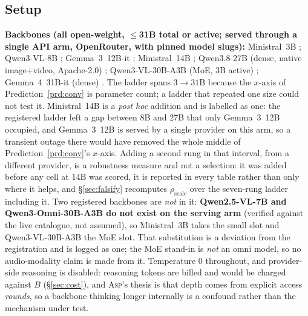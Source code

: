 \documentclass[10pt]{article}
\theoremstyle{definition}
\theoremstyle{plain}
\newcommand{\ASP}{\textsc{Asp}}
\begin{document}
\subsection{Setup}
\label{sec:setup}
\textbf{Backbones (all open-weight, $\le$31B total or active; served through a single API arm, OpenRouter, with pinned model slugs):} Ministral~3B \citep{ministral}; Qwen3-VL-8B \citep{qwen3vl}; Gemma~3~12B-it \citep{gemma3}; Ministral~14B \citep{ministral}; Qwen3.8-27B (dense, native image+video, Apache-2.0) \citep{qwen38}; Qwen3-VL-30B-A3B (MoE, 3B active) \citep{qwen3vl}; Gemma~4~31B-it (dense) \citep{gemma4}. The ladder spans $3\to31$B because the $x$-axis of Prediction~\ref{prd:conv} is parameter count; a ladder that repeated one size could not test it. Ministral~14B is a \emph{post hoc} addition and is labelled as one: the registered ladder left a gap between $8$B and $27$B that only Gemma~3~12B occupied, and Gemma~3~12B is served by a single provider on this arm, so a transient outage there would have removed the whole middle of Prediction~\ref{prd:conv}'s $x$-axis. Adding a second rung in that interval, from a different provider, is a robustness measure and not a selection: it was added before any cell at $14$B was scored, it is reported in every table rather than only where it helps, and \S\ref{sec:falsify} recomputes $\rho_{\mathrm{scale}}$ over the seven-rung ladder including it. Two registered backbones are \emph{not} in it: \textbf{Qwen2.5-VL-7B and Qwen3-Omni-30B-A3B do not exist on the serving arm} (verified against the live catalogue, not assumed), so Ministral~3B takes the small slot and Qwen3-VL-30B-A3B the MoE slot. That substitution is a deviation from the registration and is logged as one; the MoE stand-in is \emph{not} an omni model, so no audio-modality claim is made from it. Temperature $0$ throughout, and provider-side reasoning is disabled: reasoning tokens are billed and would be charged against $B$ (\S\ref{sec:cost}), and \ASP{}'s thesis is that depth comes from explicit access \emph{rounds}, so a backbone thinking longer internally is a confound rather than the mechanism under test.
\end{document}
